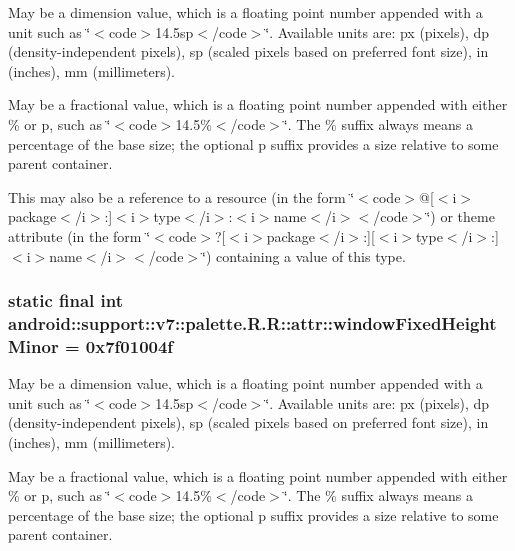 May be a dimension value, which is a floating point number appended with a unit such as \char`\"{}$<$code$>$14.5sp$<$/code$>$\char`\"{}. Available units are: px (pixels), dp (density-independent pixels), sp (scaled pixels based on preferred font size), in (inches), mm (millimeters). 

May be a fractional value, which is a floating point number appended with either \% or p, such as \char`\"{}$<$code$>$14.5\%$<$/code$>$\char`\"{}. The \% suffix always means a percentage of the base size; the optional p suffix provides a size relative to some parent container. 

This may also be a reference to a resource (in the form \char`\"{}$<$code$>$@\mbox{[}$<$i$>$package$<$/i$>$:\mbox{]}$<$i$>$type$<$/i$>$:$<$i$>$name$<$/i$>$$<$/code$>$\char`\"{}) or theme attribute (in the form \char`\"{}$<$code$>$?\mbox{[}$<$i$>$package$<$/i$>$:\mbox{]}\mbox{[}$<$i$>$type$<$/i$>$:\mbox{]}$<$i$>$name$<$/i$>$$<$/code$>$\char`\"{}) containing a value of this type. \hypertarget{classandroid_1_1support_1_1v7_1_1palette_1_1_r_1_1attr_2ae558a0661695d071a53df65cd2667f}{
\subsubsection[{windowFixedHeightMinor}]{\setlength{\rightskip}{0pt plus 5cm}static final int android::support::v7::palette.R.R::attr::windowFixedHeightMinor = 0x7f01004f}}
\label{classandroid_1_1support_1_1v7_1_1palette_1_1_r_1_1attr_2ae558a0661695d071a53df65cd2667f}


May be a dimension value, which is a floating point number appended with a unit such as \char`\"{}$<$code$>$14.5sp$<$/code$>$\char`\"{}. Available units are: px (pixels), dp (density-independent pixels), sp (scaled pixels based on preferred font size), in (inches), mm (millimeters). 

May be a fractional value, which is a floating point number appended with either \% or p, such as \char`\"{}$<$code$>$14.5\%$<$/code$>$\char`\"{}. The \% suffix always means a percentage of the base size; the optional p suffix provides a size relative to some parent container. 

